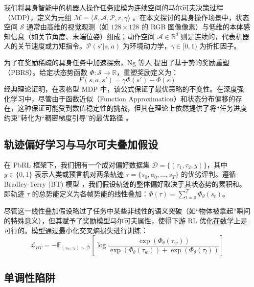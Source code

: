 我们将具身智能中的机器人操作任务建模为连续空间的马尔可夫决策过程（MDP），定义为元组 $\mathcal{M} = \langle \mathcal{S}, \mathcal{A}, \mathcal{P}, r, \gamma \rangle$ \cite{sutton2018}。在本文探讨的具身操作场景中，状态空间 $\mathcal{S}$ 通常由高维的视觉观测（如 $128 \times 128$ 的 RGB 图像像素）与低维的本体感知信息（如关节角度、末端位姿）组成；动作空间 $\mathcal{A} \in \mathbb{R}^d$ 则是连续的，代表机器人的关节速度或力矩指令。$\mathcal{P}(s'|s,a)$ 为环境动力学，$\gamma \in [0, 1)$ 为折扣因子。

为了在奖励稀疏的具身任务中加速探索，Ng 等人 \cite{ng1999policy} 提出了基于势的奖励重塑（PBRS）。给定状态势函数 $\Phi: \mathcal{S} \to \mathbb{R}$，重塑奖励定义为：
\begin{equation}
\label{eq:pbrs}
    F(s, a, s') = \gamma \Phi(s') - \Phi(s)
\end{equation}
经典理论证明，在表格型 MDP 中，该公式保证了最优策略的不变性。在深度强化学习中，尽管由于函数近似（Function Approximation）和状态分布偏移的存在，这种保证可能受到数值稳定性的挑战，但其在理论上依然提供了将“任务进度约束”转化为“稠密梯度引导”的最优路径 \cite{muller2025improving}。

\subsection{轨迹偏好学习与马尔可夫叠加假设}

在 PbRL 框架下，我们拥有一个成对偏好数据集 $\mathcal{D} = \{(\tau_1, \tau_2, y)\}$，其中 $y \in \{0, 1\}$ 表示人类或预言机对两条轨迹 $\tau = \{s_0, a_0, \dots, s_T\}$ 的优劣评判。遵循 Bradley-Terry (BT) 模型 \cite{bradley1952, christiano2017deep}，我们假设轨迹的整体偏好取决于其状态势的累积和。即轨迹 $\tau$ 的总势能定义为各帧势能的线性叠加：$\Phi(\tau) = \sum_{t=0}^T \Phi_\theta(s_t)$。

尽管这一线性叠加假设略过了任务中某些非线性的语义突破（如“物体被拿起”瞬间的特殊意义），但其赋予了奖励模型马尔可夫属性，使得下游 RL 优化在数学上是可行的。模型通过最小化交叉熵损失进行训练：
\begin{equation}
\label{eq:bt}
    \mathcal{L}_{BT} = - \mathbb{E}_{(\tau_w, \tau_l) \sim \mathcal{D}} \left[ \log \frac{\exp(\Phi_\theta(\tau_w))}{\exp(\Phi_\theta(\tau_w)) + \exp(\Phi_\theta(\tau_l))} \right]
\end{equation}

\subsection{单调性陷阱}


